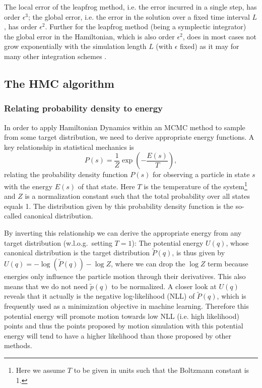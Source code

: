 The local error of the leapfrog method, i.e. the error incurred in a single step, has order $\epsilon^3$; the global error, i.e. the error in the solution over a fixed time interval $L$, has order $\epsilon^2$. Further for the leapfrog method (being a symplectic integrator) the global error in the Hamiltonian, which is also order $\epsilon^2$, does in most cases not grow exponentially with the simulation length $L$ (with $\epsilon$ fixed) as it may for many other integration schemes \parencite{Neal2011}.

\subsection{The HMC algorithm}
\label{sec:HMCAlgorithmSection}
\subsubsection{Relating probability density to energy}
In order to apply Hamiltonian Dynamics within an MCMC method to sample from some target distribution, we need to derive appropriate energy functions. A key relationship in statistical mechanics is
\begin{equation}
P(s) = \frac{1}{Z} \exp \left(- \frac{E(s)}{T} \right),
\end{equation}
relating the probability density function $P(s)$ for observing a particle in state $s$ with the energy $E(s)$ of that state. Here $T$ is the temperature of the system\footnote{Here we assume $T$ to be given in units such that the Boltzmann constant is 1.} and $Z$ is a normalization constant such that the total probability over all states equals 1. The distribution given by this probability density function is the so-called canonical distribution.

By inverting this relationship we can derive the appropriate energy from any target distribution (w.l.o.g.\ setting $T=1$): The potential energy $U(q)$, whose canonical distribution is the target distribution $\tilde{P}(q)$, is thus given by $U(q) = -\log \left( \tilde{P}(q) \right) - \log Z$,
where we can drop the $\log Z$ term because energies only influence the particle motion through their derivatives. This also means that we do not need $\tilde{p}(q)$ to be normalized. A closer look at $U(q)$ reveals that it actually is the negative log-likelihood (NLL) of $\tilde{P}(q)$, which is frequently used as a minimization objective in machine learning. Therefore this potential energy will promote motion towards low NLL (i.e. high likelihood) points and thus the points proposed by motion simulation with this potential energy will tend to have a higher likelihood than those proposed by other methods.

